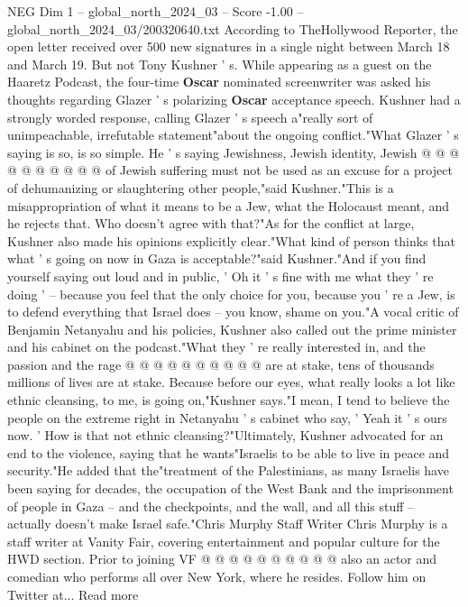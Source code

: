 \begin{textsample}{NEG Dim 1 – global\_north\_2024\_03 – Score -1.00 – global\_north\_2024\_03/200320640.txt}
According to TheHollywood Reporter, the open letter received over 500 new signatures in a single night between March 18 and March 19.
But not Tony Kushner ' s.
While appearing as a guest on the Haaretz Podcast, the four-time \textbf{Oscar} nominated screenwriter was asked his thoughts regarding Glazer ' s polarizing \textbf{Oscar} acceptance speech.
Kushner had a strongly worded response, calling Glazer ' s speech a"really sort of unimpeachable, irrefutable statement"about the ongoing conflict."What Glazer ' s saying is so, is so simple.
He ' s saying Jewishness, Jewish identity, Jewish @ @ @ @ @ @ @ @ @ @ of Jewish suffering must not be used as an excuse for a project of dehumanizing or slaughtering other people,"said Kushner."This is a misappropriation of what it means to be a Jew, what the Holocaust meant, and he rejects that.
Who doesn't agree with that?"As for the conflict at large, Kushner also made his opinions explicitly clear."What kind of person thinks that what ' s going on now in Gaza is acceptable?"said Kushner."And if you find yourself saying out loud and in public, ' Oh it ' s fine with me what they ' re doing ' -- because you feel that the only choice for you, because you ' re a Jew, is to defend everything that Israel does -- you know, shame on you."A vocal critic of Benjamin Netanyahu and his policies, Kushner also called out the prime minister and his cabinet on the podcast."What they ' re really interested in, and the passion and the rage @ @ @ @ @ @ @ @ @ @ are at stake, tens of thousands millions of lives are at stake.
Because before our eyes, what really looks a lot like ethnic cleansing, to me, is going on,"Kushner says."I mean, I tend to believe the people on the extreme right in Netanyahu ' s cabinet who say, ' Yeah it ' s ours now. ' How is that not ethnic cleansing?"Ultimately, Kushner advocated for an end to the violence, saying that he wants"Israelis to be able to live in peace and security."He added that the"treatment of the Palestinians, as many Israelis have been saying for decades, the occupation of the West Bank and the imprisonment of people in Gaza -- and the checkpoints, and the wall, and all this stuff -- actually doesn't make Israel safe."Chris Murphy Staff Writer Chris Murphy is a staff writer at Vanity Fair, covering entertainment and popular culture for the HWD section.
Prior to joining VF @ @ @ @ @ @ @ @ @ @ also an actor and comedian who performs all over New York, where he resides.
Follow him on Twitter at...
Read more

\end{textsample}
